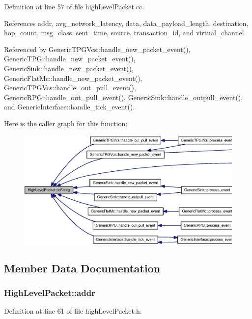 Definition at line 57 of file highLevelPacket.cc.

References addr, avg\_\-network\_\-latency, data, data\_\-payload\_\-length, destination, hop\_\-count, msg\_\-class, sent\_\-time, source, transaction\_\-id, and virtual\_\-channel.

Referenced by GenericTPGVcs::handle\_\-new\_\-packet\_\-event(), GenericTPG::handle\_\-new\_\-packet\_\-event(), GenericSink::handle\_\-new\_\-packet\_\-event(), GenericFlatMc::handle\_\-new\_\-packet\_\-event(), GenericTPGVcs::handle\_\-out\_\-pull\_\-event(), GenericRPG::handle\_\-out\_\-pull\_\-event(), GenericSink::handle\_\-outpull\_\-event(), and GenericInterface::handle\_\-tick\_\-event().

Here is the caller graph for this function:\nopagebreak
\begin{figure}[H]
\begin{center}
\leavevmode
\includegraphics[width=420pt]{classHighLevelPacket_a2292ef0554d515cf08aeed8ca46d419_icgraph}
\end{center}
\end{figure}


\subsection{Member Data Documentation}
\subsubsection[{addr}]{ {\bf HighLevelPacket::addr}}\label{classHighLevelPacket_64f74b9238b8a606a82e41da4d93de93}




Definition at line 61 of file highLevelPacket.h.

